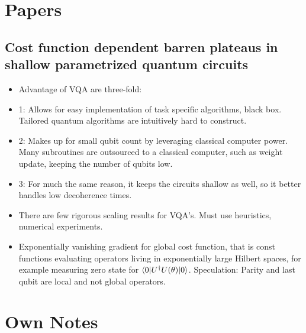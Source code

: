 \documentclass[]{article}
\title{}
\author{}
\begin{document}
\maketitle

\section{Papers}
\subsection{Cost function dependent barren plateaus in shallow parametrized quantum circuits}

\begin{itemize}
	\item Advantage of VQA are three-fold:
	
	\item 1: Allows for easy implementation of task specific algorithms, black box. Tailored quantum algorithms are intuitively hard to construct. 
	
	\item 2: Makes up for small qubit count by leveraging classical computer power. Many subroutines are outsourced to a classical computer, such as weight update, keeping the number of qubits low. 
	
	\item 3: For much the same reason, it keeps the circuits shallow as well, so it better handles low decoherence times. 
	
	\item There are few rigorous scaling results for VQA's. Must use heuristics, numerical experiments.

	\item Exponentially vanishing gradient for global cost function, that is const functions evaluating operators living in exponentially large Hilbert spaces, for example measuring zero state for  $\braket{0|U^{\dagger} U(\theta)|0}$. Speculation: Parity and last qubit are local and not global operators.
	
	
\end{itemize}


\section{Own Notes}
\end{document}
